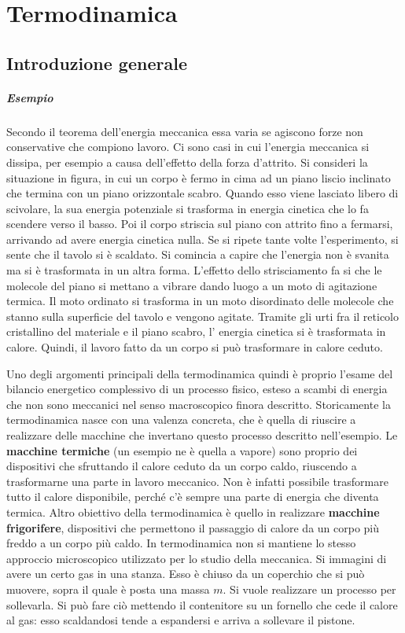 \chapter{Termodinamica}

\section{Introduzione generale}

\paragraph{Esempio} Secondo il teorema dell'energia meccanica essa varia se agiscono forze non conservative che compiono lavoro. Ci sono casi in cui l'energia meccanica si dissipa, per esempio a causa dell'effetto della forza d'attrito. Si consideri la situazione in figura, in cui un corpo è fermo in cima ad un piano liscio inclinato che termina con un piano orizzontale scabro. Quando esso viene lasciato libero di scivolare, la sua energia potenziale si trasforma in energia cinetica che lo fa scendere verso il basso. Poi il corpo striscia sul piano con attrito fino a fermarsi, arrivando ad avere energia cinetica nulla. Se si ripete tante volte l'esperimento, si sente che il tavolo si è scaldato. Si comincia a capire che l'energia non è svanita ma si è trasformata in un altra forma. L'effetto dello strisciamento fa si che le molecole del piano si mettano a vibrare dando luogo a un moto di agitazione termica. Il moto ordinato si trasforma in un moto disordinato delle molecole che stanno sulla superficie del tavolo e vengono agitate.
Tramite gli urti fra il reticolo cristallino del materiale e il piano scabro, l' energia cinetica si è trasformata in calore. Quindi, il lavoro fatto da un corpo si può trasformare in calore ceduto.

Uno degli argomenti principali della termodinamica quindi è proprio l'esame del bilancio energetico complessivo di un processo fisico, esteso a scambi di energia che non sono meccanici nel senso macroscopico finora descritto.
Storicamente la termodinamica nasce con una valenza concreta, che è quella di riuscire a realizzare delle macchine che invertano questo processo descritto nell'esempio. Le \textbf{macchine termiche} (un esempio ne è quella a vapore) sono proprio dei dispositivi che sfruttando il calore ceduto da un corpo caldo, riuscendo a trasformarne una parte in lavoro meccanico. Non è infatti possibile trasformare tutto il calore disponibile, perché c'è sempre una parte di energia che diventa termica. Altro obiettivo della termodinamica è quello in realizzare \textbf{macchine frigorifere}, dispositivi che permettono il passaggio di calore da un corpo più freddo a un corpo più caldo.
In termodinamica non si mantiene lo stesso approccio microscopico utilizzato per lo studio della meccanica. Si immagini di avere un certo gas in una stanza. Esso è chiuso da un coperchio che si può muovere, sopra il quale è posta una massa $m$. Si vuole realizzare un processo per sollevarla. Si può fare ciò mettendo il contenitore su un fornello che cede il calore al gas: esso scaldandosi tende a espandersi e arriva a sollevare il pistone.

